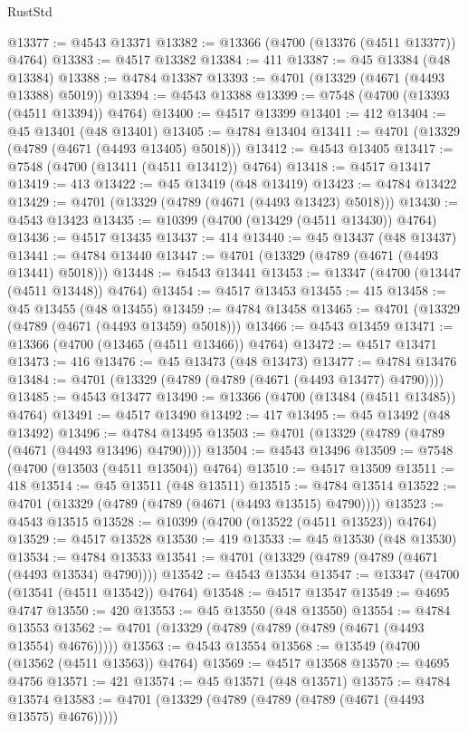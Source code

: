 \begin{lexlean}{RustStd}
\begin{coremodule}
@13377 := @4543 @13371
@13382 := @13366 (@4700 (@13376 (@4511 @13377)) @4764)
@13383 := @4517 @13382
@13384 := 411
@13387 := @45 @13384 (@48 @13384)
@13388 := @4784 @13387
@13393 := @4701 (@13329 (@4671 (@4493 @13388) @5019))
@13394 := @4543 @13388
@13399 := @7548 (@4700 (@13393 (@4511 @13394)) @4764)
@13400 := @4517 @13399
@13401 := 412
@13404 := @45 @13401 (@48 @13401)
@13405 := @4784 @13404
@13411 := @4701 (@13329 (@4789 (@4671 (@4493 @13405) @5018)))
@13412 := @4543 @13405
@13417 := @7548 (@4700 (@13411 (@4511 @13412)) @4764)
@13418 := @4517 @13417
@13419 := 413
@13422 := @45 @13419 (@48 @13419)
@13423 := @4784 @13422
@13429 := @4701 (@13329 (@4789 (@4671 (@4493 @13423) @5018)))
@13430 := @4543 @13423
@13435 := @10399 (@4700 (@13429 (@4511 @13430)) @4764)
@13436 := @4517 @13435
@13437 := 414
@13440 := @45 @13437 (@48 @13437)
@13441 := @4784 @13440
@13447 := @4701 (@13329 (@4789 (@4671 (@4493 @13441) @5018)))
@13448 := @4543 @13441
@13453 := @13347 (@4700 (@13447 (@4511 @13448)) @4764)
@13454 := @4517 @13453
@13455 := 415
@13458 := @45 @13455 (@48 @13455)
@13459 := @4784 @13458
@13465 := @4701 (@13329 (@4789 (@4671 (@4493 @13459) @5018)))
@13466 := @4543 @13459
@13471 := @13366 (@4700 (@13465 (@4511 @13466)) @4764)
@13472 := @4517 @13471
@13473 := 416
@13476 := @45 @13473 (@48 @13473)
@13477 := @4784 @13476
@13484 := @4701 (@13329 (@4789 (@4789 (@4671 (@4493 @13477) @4790))))
@13485 := @4543 @13477
@13490 := @13366 (@4700 (@13484 (@4511 @13485)) @4764)
@13491 := @4517 @13490
@13492 := 417
@13495 := @45 @13492 (@48 @13492)
@13496 := @4784 @13495
@13503 := @4701 (@13329 (@4789 (@4789 (@4671 (@4493 @13496) @4790))))
@13504 := @4543 @13496
@13509 := @7548 (@4700 (@13503 (@4511 @13504)) @4764)
@13510 := @4517 @13509
@13511 := 418
@13514 := @45 @13511 (@48 @13511)
@13515 := @4784 @13514
@13522 := @4701 (@13329 (@4789 (@4789 (@4671 (@4493 @13515) @4790))))
@13523 := @4543 @13515
@13528 := @10399 (@4700 (@13522 (@4511 @13523)) @4764)
@13529 := @4517 @13528
@13530 := 419
@13533 := @45 @13530 (@48 @13530)
@13534 := @4784 @13533
@13541 := @4701 (@13329 (@4789 (@4789 (@4671 (@4493 @13534) @4790))))
@13542 := @4543 @13534
@13547 := @13347 (@4700 (@13541 (@4511 @13542)) @4764)
@13548 := @4517 @13547
@13549 := @4695 @4747
@13550 := 420
@13553 := @45 @13550 (@48 @13550)
@13554 := @4784 @13553
@13562 := @4701 (@13329 (@4789 (@4789 (@4789 (@4671 (@4493 @13554) @4676)))))
@13563 := @4543 @13554
@13568 := @13549 (@4700 (@13562 (@4511 @13563)) @4764)
@13569 := @4517 @13568
@13570 := @4695 @4756
@13571 := 421
@13574 := @45 @13571 (@48 @13571)
@13575 := @4784 @13574
@13583 := @4701 (@13329 (@4789 (@4789 (@4789 (@4671 (@4493 @13575) @4676)))))

\end{coremodule}
\end{lexlean}
